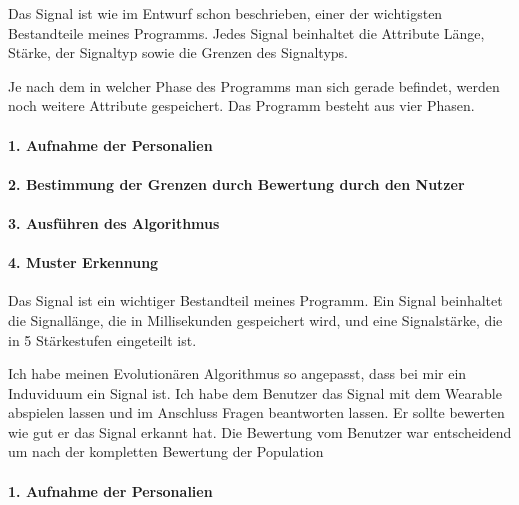 
Das Signal ist wie im Entwurf schon beschrieben, einer der wichtigsten Bestandteile meines Programms. 
Jedes Signal beinhaltet die Attribute Länge, Stärke, der Signaltyp sowie die Grenzen des Signaltyps.

Je nach dem in welcher Phase des Programms man sich gerade befindet, werden noch weitere Attribute gespeichert.
Das Programm besteht aus vier Phasen.

\paragraph {1. Aufnahme der Personalien}
\paragraph {2. Bestimmung der Grenzen durch Bewertung durch den Nutzer}
\paragraph {3. Ausführen des Algorithmus}
\paragraph {4. Muster Erkennung} 

Das Signal ist ein wichtiger Bestandteil meines Programm. 
Ein Signal beinhaltet die Signall{\"a}nge, die in Millisekunden gespeichert wird, und eine Signalst{\"a}rke, die in 5 St{\"a}rkestufen eingeteilt ist. 



Ich habe meinen Evolution{\"a}ren Algorithmus so angepasst, dass bei mir ein Induviduum ein Signal ist. 
Ich habe dem Benutzer das Signal mit dem Wearable abspielen lassen und im Anschluss Fragen beantworten lassen. 
Er sollte bewerten wie gut er das Signal erkannt hat. Die Bewertung vom Benutzer war entscheidend um nach der kompletten Bewertung der Population 










\paragraph {1. Aufnahme der Personalien}

